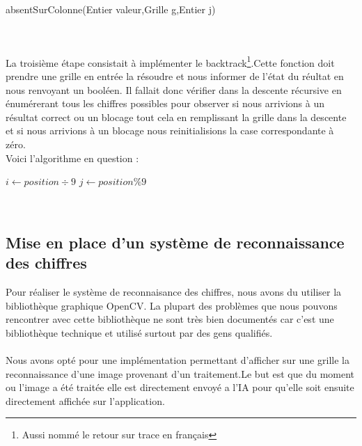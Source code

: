 \documentclass{article}
\begin{document}
\begin{algorithm}[H]
\SetAlgoLined
{}
\caption{absentSurColonne(Entier valeur,Grille g,Entier j)}
\end{algorithm}\\\\


La troisième étape consistait à implémenter le backtrack\footnote{Aussi nommé le retour sur trace en français}.Cette fonction doit prendre une grille en entrée la résoudre et nous informer de l'état du réultat en nous renvoyant un booléen.
Il fallait donc vérifier dans la descente récursive en énumérerant tous les chiffres possibles pour observer si nous arrivions à un résultat correct ou un blocage tout cela en remplissant la grille dans la descente et si nous arrivions à un blocage nous reinitialisions la case correspondante à zéro.\\
Voici l'algorithme en question :


\begin{algorithm}[H]
\SetAlgoLined
{}
$i \longleftarrow position \div 9  $
$j \longleftarrow position \% 9$\\
\end{algorithm}\\

\subsection{Mise en place d'un système de reconnaissance des chiffres}
Pour réaliser le système de reconnaisance des chiffres, nous avons du utiliser la bibliothèque graphique OpenCV.
La plupart des problèmes que nous pouvons rencontrer avec cette bibliothèque ne sont très bien documentés car c'est une bibliothèque technique et utilisé surtout par des gens qualifiés.\\\\
Nous avons opté pour une implémentation permettant d'afficher sur une grille la reconnaissance d'une image provenant d'un traitement.Le but est que du moment ou l'image a été traitée elle est directement envoyé a l'IA pour qu'elle soit ensuite directement affichée sur l'application.\\
\end{document}
